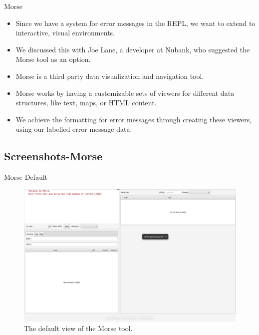 \documentclass{beamer}
\begin{document}
\begin{frame}{Morse}
  \begin{itemize}
    \item<1-> Since we have a system for error messages in the REPL, we want to extend to interactive, visual environments.
    \item<2-> We discussed this with Joe Lane, a developer at Nubank, who suggested the Morse tool as an option.
    \item<3-> Morse is a third party data visualization and navigation tool.
    \item<4-> Morse works by having a customizable sets of viewers for different data structures, like text, maps, or HTML content.
    \item<5-> We achieve the formatting for error messages through creating these viewers, using our labelled error message data.
  \end{itemize}
\end{frame}

\subsection{Screenshots-Morse}
\begin{frame}{Morse Default}
  \begin{figure}
    \centering
    \includegraphics[width=\textwidth]{../resources/MorseDefault.jpg}
    \caption{The default view of the Morse tool.}
    \label{fig:defaultMorse}
  \end{figure}
\end{frame}
\end{document}
